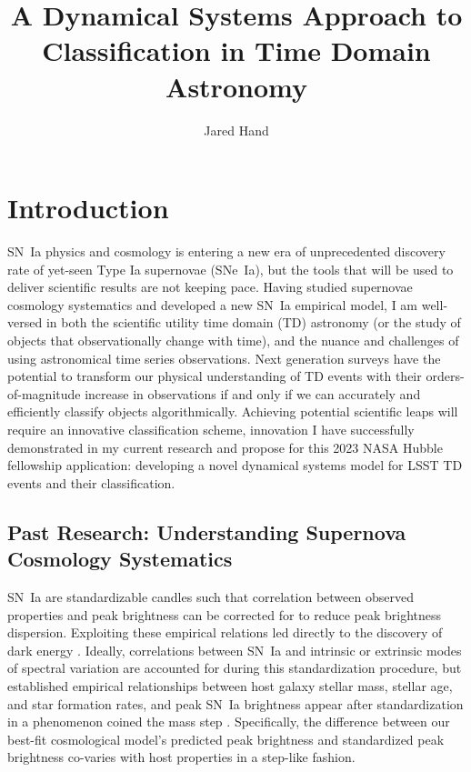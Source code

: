 \documentclass[modern]{aastex631}
\begin{document}
\title{A Dynamical Systems Approach to Classification in Time Domain Astronomy}
\author[0000-0001-7260-4274]{Jared Hand}

\section{Introduction}
SN~Ia physics and cosmology is entering a new era of unprecedented discovery rate of yet-seen Type Ia supernovae (SNe~Ia), but the tools that will be used to deliver scientific results are not keeping pace. 
Having studied supernovae cosmology systematics and developed a new SN~Ia empirical model, I am well-versed in both the scientific utility time domain (TD) astronomy (or the study of objects that observationally change with time), and the nuance and challenges of using astronomical time series observations. 
Next generation surveys have the potential to transform our physical understanding of TD events with their orders-of-magnitude increase in observations if and only if we can accurately and efficiently classify objects algorithmically. 
Achieving potential scientific leaps will require an innovative classification scheme, innovation I have successfully demonstrated in my current research and propose for this 2023 NASA Hubble fellowship application: developing a novel dynamical systems model for LSST TD events and their classification.  

\subsection{Past Research: Understanding Supernova Cosmology Systematics}
SN~Ia are standardizable candles such that correlation between observed properties and peak brightness can be corrected for to reduce peak brightness dispersion. 
Exploiting these empirical relations led directly to the discovery of dark energy \citep{Riess1998,Perlmutter99}. 
Ideally, correlations between SN~Ia and intrinsic or extrinsic modes of spectral variation are accounted for during this standardization procedure, but established empirical relationships between host galaxy stellar mass, stellar age, and star formation rates, and peak SN~Ia brightness appear after standardization in a phenomenon coined the mass step \citep{Sullivan10,Rigault18}. 
Specifically, the difference between our best-fit cosmological model's predicted peak brightness and standardized peak brightness co-varies with host properties in a step-like fashion. 
\end{document}
